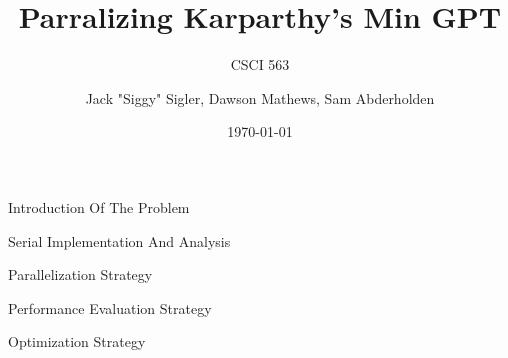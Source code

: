 \documentclass[aspectratio=169]{beamer}
\title{Parralizing Karparthy's Min GPT}
\subtitle{CSCI 563}
\author{Jack "Siggy" Sigler, Dawson Mathews, Sam Abderholden}
\institute{Colorado School of Mines}
\date{\today}
\begin{document}
\begin{frame}
  \titlepage
\end{frame}

\begin{frame}{Introduction Of The Problem}
\end{frame}

\begin{frame}{Serial Implementation And Analysis}
\end{frame}

\begin{frame}{Parallelization Strategy}
\end{frame}

\begin{frame}{Performance Evaluation Strategy}
\end{frame}

\begin{frame}{Optimization Strategy}
\end{frame}
\end{document}
